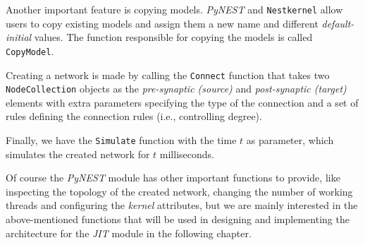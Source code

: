 Another important feature is copying models. \emph{PyNEST} and \texttt{Nestkernel} allow users to copy existing models and assign them a new name and different \emph{default-initial} values. The function responsible for copying the models is called \texttt{CopyModel}.

Creating a network is made by calling the \texttt{Connect} function that takes two \texttt{NodeCollection} objects as the \emph{pre-synaptic (source)} and \emph{post-synaptic (target)} elements with extra parameters specifying the type of the connection and a set of rules defining the connection rules (i.e., controlling degree).

Finally, we have the \texttt{Simulate} function  with the time $t$ as parameter, which simulates the created network for $t$ milliseconds.

Of course the \emph{PyNEST} module has other important functions to provide, like inspecting the topology of the created network, changing the number of working threads and configuring the \emph{kernel} attributes, but we are mainly interested in the above-mentioned functions that will be used in designing and implementing the architecture for the \emph{JIT} module in the following chapter.
 
 





